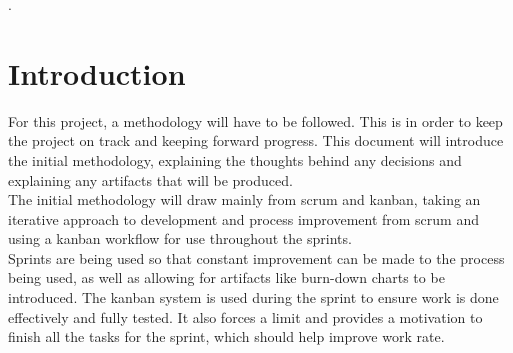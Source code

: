 \documentclass[11pt,fleqn,twoside]{article}
\begin{document}
\wordcount{}

\mmp
 .
\setcounter{tocdepth}{3} %



\section{Introduction}
For this project, a methodology will have to be followed. This is in order to keep the project on track and keeping forward progress. This document will introduce the initial methodology, explaining the thoughts behind any decisions and explaining any artifacts that will be produced.\\

The initial methodology will draw mainly from scrum and kanban, taking an iterative approach to development and process improvement from scrum and using a kanban workflow for use throughout the sprints.\\

Sprints are being used so that constant improvement can be made to the process being used, as well as allowing for artifacts like burn-down charts to be introduced. The kanban system is used during the sprint to ensure work is done effectively and fully tested. It also forces a limit and provides a motivation to finish all the tasks for the sprint, which should help improve work rate. 
\end{document}
